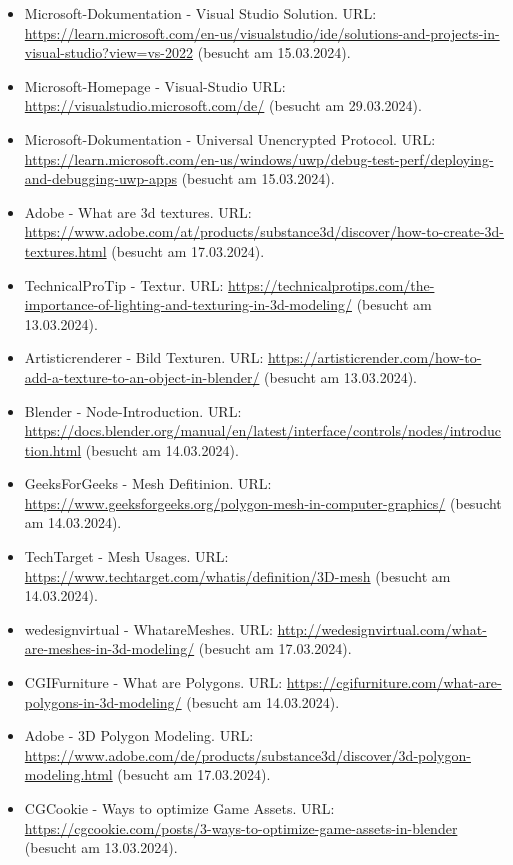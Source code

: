 \begin{itemize}[leftmargin=0pt]
    \item Microsoft-Dokumentation - Visual Studio Solution. {\scriptsize URL:} \url{https://learn.microsoft.com/en-us/visualstudio/ide/solutions-and-projects-in-visual-studio?view=vs-2022} (besucht am 15.03.2024).
    \item Microsoft-Homepage - Visual-Studio {\scriptsize URL:} \url{https://visualstudio.microsoft.com/de/} (besucht am 29.03.2024).
    \item Microsoft-Dokumentation - Universal Unencrypted Protocol. {\scriptsize URL:} \url{https://learn.microsoft.com/en-us/windows/uwp/debug-test-perf/deploying-and-debugging-uwp-apps} (besucht am 15.03.2024).
    \item Adobe - What are 3d textures. {\scriptsize URL:} \url{https://www.adobe.com/at/products/substance3d/discover/how-to-create-3d-textures.html} (besucht am 17.03.2024).
    \item TechnicalProTip - Textur. {\scriptsize URL:} \url{https://technicalprotips.com/the-importance-of-lighting-and-texturing-in-3d-modeling/} (besucht am 13.03.2024).
    \item Artisticrenderer - Bild Texturen. {\scriptsize URL:} \url{https://artisticrender.com/how-to-add-a-texture-to-an-object-in-blender/} (besucht am 13.03.2024).
    \item Blender - Node-Introduction. {\scriptsize URL:} \url{https://docs.blender.org/manual/en/latest/interface/controls/nodes/introduction.html} (besucht am 14.03.2024).
    \item GeeksForGeeks - Mesh Defitinion. {\scriptsize URL:} \url{https://www.geeksforgeeks.org/polygon-mesh-in-computer-graphics/} (besucht am 14.03.2024).
    \item TechTarget - Mesh Usages. {\scriptsize URL:} \url{https://www.techtarget.com/whatis/definition/3D-mesh} (besucht am 14.03.2024).
    \item wedesignvirtual - WhatareMeshes. {\scriptsize URL:} \url{http://wedesignvirtual.com/what-are-meshes-in-3d-modeling/} (besucht am 17.03.2024).
    \item CGIFurniture - What are Polygons. {\scriptsize URL:} \url{https://cgifurniture.com/what-are-polygons-in-3d-modeling/} (besucht am 14.03.2024).
    \item Adobe - 3D Polygon Modeling. {\scriptsize URL:} \url{https://www.adobe.com/de/products/substance3d/discover/3d-polygon-modeling.html} (besucht am 17.03.2024).
    \item CGCookie - Ways to optimize Game Assets. {\scriptsize URL:} \url{https://cgcookie.com/posts/3-ways-to-optimize-game-assets-in-blender} (besucht am 13.03.2024).

\end{itemize}
